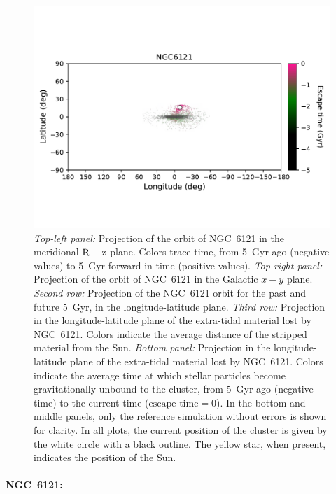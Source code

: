 \begin{figure}
\begin{center}
                    \includegraphics[clip=true, trim = 0mm 20mm 0mm 10mm, width=0.9\columnwidth]{images/PII_individual_NGC6121_NGC6121_LB_tesc.pdf}
                \end{center}
                \caption{ \emph{Top-left panel:} Projection of the orbit of NGC~6121 in the meridional $\rm R-z$ plane. Colors trace time, from 5~Gyr ago (negative values) to 5~Gyr forward in time (positive values). \emph{Top-right panel:} Projection of the orbit of NGC~6121 in the Galactic $x-y$ plane.  \emph{Second row:} Projection of the NGC~6121 orbit for the past and future 5~Gyr, in the longitude-latitude plane.   \emph{Third row:} Projection in the longitude-latitude plane of the extra-tidal material lost by NGC~6121. Colors indicate the average distance of the stripped material from the Sun.  \emph{Bottom panel:} Projection in the longitude-latitude plane of the extra-tidal material lost by NGC~6121. Colors indicate the average time at which stellar particles become gravitationally unbound to the cluster, from 5~Gyr ago (negative time) to the current time ($\textrm{escape time} = 0$). In the bottom and middle panels, only the reference simulation without errors is shown for clarity. In all plots, the current position of the cluster is given by the white circle with a black outline. The yellow star, when present, indicates the position of the Sun. }\label{ngc6121_stream}
            \end{figure}
            \onecolumn


            \paragraph{NGC~6121: }

